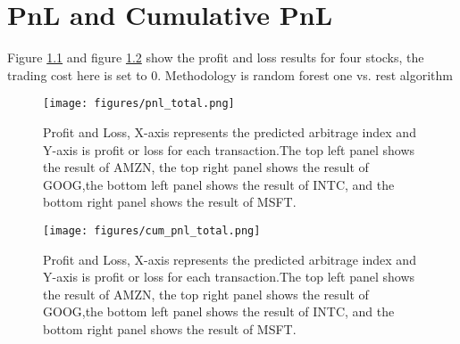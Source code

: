 \begin{table}[htp!]
	\caption{MSFT ask-low arbitrage opportunity prediction(5 seconds)}
	\label{ask_low_prediction}
	\begin{center}
	\end{center}
\end{table}

\chapter{PnL and Cumulative PnL}
Figure \ref{fig:pnl} and figure \ref{fig:cum_pnl} show the profit and loss results for four stocks, the trading cost here is set to 0. Methodology is random forest one vs. rest algorithm

\begin{figure}[hbtp]
  \begin{center}
    \texttt{[image: figures/pnl\_total.png]}
  \end{center}
\caption{Profit and Loss,  X-axis represents the predicted arbitrage index and Y-axis is profit or loss for each transaction.The top left panel shows the result of AMZN, the top right panel shows the result of GOOG,the bottom left panel shows the result of INTC, and the bottom right panel shows the result of MSFT. } \label{fig:pnl}
\end{figure}

\begin{figure}[hbtp]
  \begin{center}
    \texttt{[image: figures/cum\_pnl\_total.png]}
  \end{center}
\caption{Profit and Loss,  X-axis represents the predicted arbitrage index and Y-axis is profit or loss for each transaction.The top left panel shows the result of AMZN, the top right panel shows the result of GOOG,the bottom left panel shows the result of INTC, and the bottom right panel shows the result of MSFT.} \label{fig:cum_pnl}
\end{figure}
				

